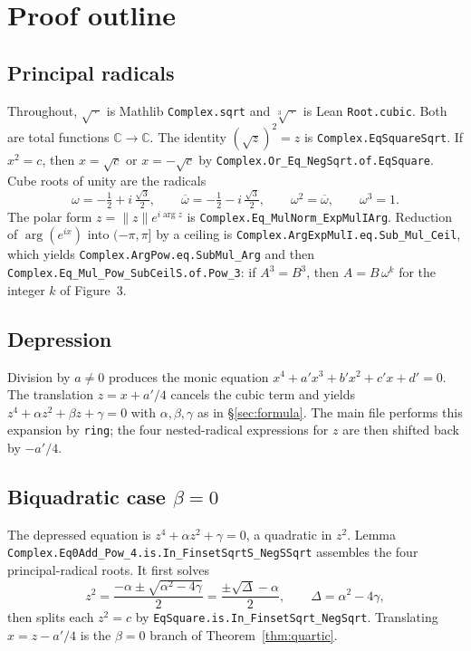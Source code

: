 \documentclass[11pt,a4paper]{article}
\newcommand{\C}{\mathbb{C}}
\newcommand{\Arg}{\operatorname{arg}}
\begin{document}
\section{Proof outline}
\label{sec:proof}

\subsection{Principal radicals}
\label{sec:radicals}

Throughout, \(\sqrt{\,\cdot\,}\) is Mathlib \texttt{Complex.sqrt} and \(\sqrt[3]{\,\cdot\,}\) is Lean \texttt{Root.cubic}.
Both are total functions \(\C\to\C\).
The identity \((\sqrt{z})^2=z\) is \texttt{Complex.EqSquareSqrt}.
If \(x^2=c\), then \(x=\sqrt{c}\) or \(x=-\sqrt{c}\) by \texttt{Complex.Or\_Eq\_NegSqrt.of.EqSquare}.
Cube roots of unity are the radicals
\[
\omega=-\tfrac12+i\,\tfrac{\sqrt{3}}{2},\qquad
\overline{\omega}=-\tfrac12-i\,\tfrac{\sqrt{3}}{2},\qquad
\omega^{2}=\overline{\omega},\qquad
\omega^{3}=1.
\]
The polar form \(z=\|z\|e^{i\Arg z}\) is \texttt{Complex.Eq\_MulNorm\_ExpMulIArg}.
Reduction of \(\Arg(e^{ix})\) into \((-\pi,\pi]\) by a ceiling is \texttt{Complex.ArgExpMulI.eq.Sub\_Mul\_Ceil}, which yields \texttt{Complex.ArgPow.eq.SubMul\_Arg} and then
\texttt{Complex.Eq\_Mul\_Pow\_SubCeilS.of.Pow\_3}:
if \(A^3=B^3\), then \(A=B\,\omega^{k}\) for the integer \(k\) of Figure~3.

\subsection{Depression}
\label{sec:depress}

Division by \(a\neq 0\) produces the monic equation \(x^4+a'x^3+b'x^2+c'x+d'=0\).
The translation \(z=x+a'/4\) cancels the cubic term and yields \(z^4+\alpha z^2+\beta z+\gamma=0\) with \(\alpha,\beta,\gamma\) as in \S\ref{sec:formula}.
The main file performs this expansion by \texttt{ring}; the four nested-radical expressions for \(z\) are then shifted back by \(-a'/4\).

\subsection{Biquadratic case \texorpdfstring{$\beta=0$}{beta=0}}
\label{sec:biquad}

The depressed equation is \(z^4+\alpha z^2+\gamma=0\), a quadratic in \(z^2\).
Lemma \texttt{Complex.Eq0Add\_Pow\_4.is.In\_FinsetSqrtS\_NegSSqrt} assembles the four principal-radical roots.
It first solves
\[
z^2=\frac{-\alpha\pm\sqrt{\alpha^2-4\gamma}}{2}=\frac{\pm\sqrt{\Delta}-\alpha}{2},\qquad \Delta=\alpha^2-4\gamma,
\]
then splits each \(z^2=c\) by \texttt{EqSquare.is.In\_FinsetSqrt\_NegSqrt}.
Translating \(x=z-a'/4\) is the \(\beta=0\) branch of Theorem~\ref{thm:quartic}.
\end{document}
